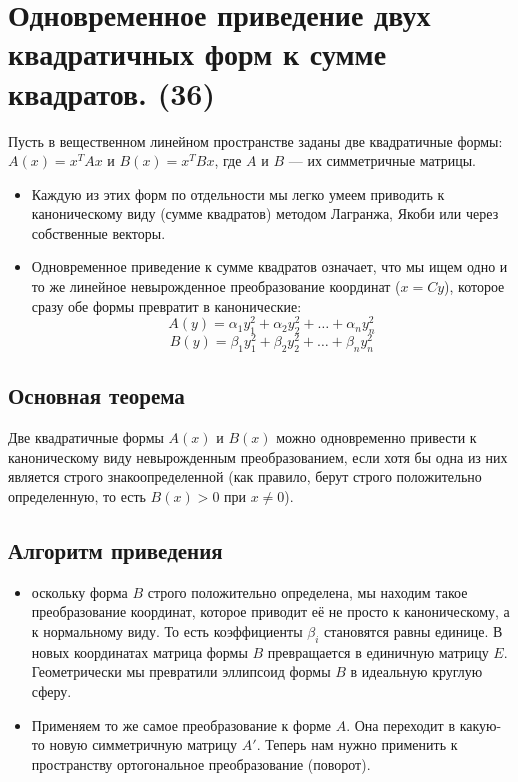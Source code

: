 \documentclass[14pt]{extreport}
\begin{document}
    \chapter{Одновременное приведение двух квадратичных форм к сумме квадратов. (36)}

    Пусть в вещественном линейном пространстве заданы две квадратичные формы: $A(x) = x^T A x$ и $B(x) = x^T B x$, где $A$ и $B$ — их симметричные матрицы.

    \begin{itemize}
        \item Каждую из этих форм по отдельности мы легко умеем приводить к каноническому виду (сумме квадратов) методом Лагранжа, Якоби или через собственные векторы.
        \item Одновременное приведение к сумме квадратов означает, что мы ищем одно и то же линейное невырожденное преобразование координат ($x = C y$), которое сразу обе формы превратит в канонические:$$A(y) = \alpha_1 y_1^2 + \alpha_2 y_2^2 + \dots + \alpha_n y_n^2$$$$B(y) = \beta_1 y_1^2 + \beta_2 y_2^2 + \dots + \beta_n y_n^2$$
    \end{itemize}

    \section{Основная теорема}
    \begin{thbox}
        Две квадратичные формы $A(x)$ и $B(x)$ можно одновременно привести к каноническому виду невырожденным преобразованием, если хотя бы одна из них является строго знакоопределенной (как правило, берут строго положительно определенную, то есть $B(x) > 0$ при $x \neq 0$).
    \end{thbox}

    \section{Алгоритм приведения}

    \begin{itemize}
        \item оскольку форма $B$ строго положительно определена, мы находим такое преобразование координат, которое приводит её не просто к каноническому, а к нормальному виду. То есть коэффициенты $\beta_i$ становятся равны единице. В новых координатах матрица формы $B$ превращается в единичную матрицу $E$. Геометрически мы превратили эллипсоид формы $B$ в идеальную круглую сферу.
        \item Применяем то же самое преобразование к форме $A$. Она переходит в какую-то новую симметричную матрицу $A'$. Теперь нам нужно применить к пространству ортогональное преобразование (поворот).
    \end{itemize}
\end{document}
